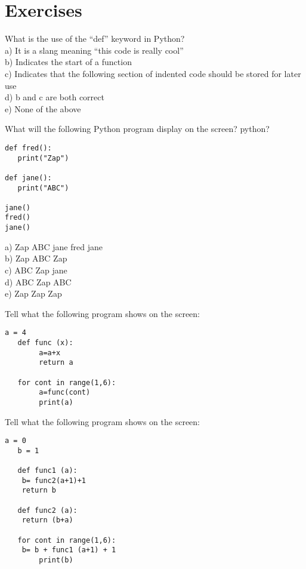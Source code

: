 \section*{Exercises}\label{ejercicios}

\begin{exercise}
What is the use of the ``def'' keyword in Python?\\
a) It is a slang meaning ``this code is really cool''\\
b) Indicates the start of a function\\
c) Indicates that the following section of indented code should be stored for later use\\
d) b and c are both correct\\
e) None of the above
\end{exercise}

\begin{exercise}
What will the following Python program display on the screen?
python?

\begin{Verbatim}[frame=single]
def fred():
   print("Zap")

def jane():
   print("ABC")

jane()
fred()
jane()
\end{Verbatim}
a) Zap ABC jane fred jane\\
b) Zap ABC Zap\\
c) ABC Zap jane\\
d) ABC Zap ABC\\
e) Zap Zap Zap
\end{exercise}

\begin{exercise}
Tell what the following program shows on the screen:
\begin{Verbatim}[frame=single]
   a = 4
   def func (x):
        a=a+x
        return a

   for cont in range(1,6):
        a=func(cont)
        print(a)
\end{Verbatim}
\end{exercise}
\begin{exercise}
Tell what the following program shows on the screen:
\begin{Verbatim}[frame=single]
   a = 0
   b = 1

   def func1 (a):
	b= func2(a+1)+1
	return b

   def func2 (a):
	return (b+a)

   for cont in range(1,6):
	b= b + func1 (a+1) + 1
        print(b)
\end{Verbatim}
\end{exercise}

